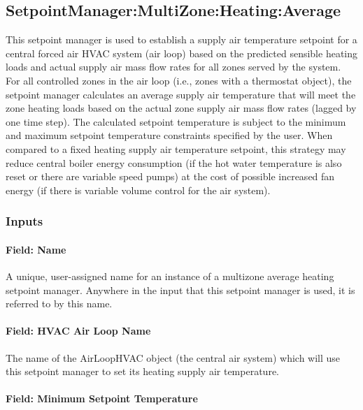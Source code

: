 \subsection{SetpointManager:MultiZone:Heating:Average}\label{setpointmanagermultizoneheatingaverage}

This setpoint manager is used to establish a supply air temperature setpoint for a central forced air HVAC system (air loop) based on the predicted sensible heating loads and actual supply air mass flow rates for all zones served by the system. For all controlled zones in the air loop (i.e., zones with a thermostat object), the setpoint manager calculates an average supply air temperature that will meet the zone heating loads based on the actual zone supply air mass flow rates (lagged by one time step). The calculated setpoint temperature is subject to the minimum and maximum setpoint temperature constraints specified by the user. When compared to a fixed heating supply air temperature setpoint, this strategy may reduce central boiler energy consumption (if the hot water temperature is also reset or there are variable speed pumps) at the cost of possible increased fan energy (if there is variable volume control for the air system).

\subsubsection{Inputs}\label{inputs-15-013}

\paragraph{Field: Name}\label{field-name-15-008}

A unique, user-assigned name for an instance of a multizone average heating setpoint manager. Anywhere in the input that this setpoint manager is used, it is referred to by this name.

\paragraph{Field: HVAC Air Loop Name}\label{field-hvac-air-loop-name-5}

The name of the AirLoopHVAC object (the central air system) which will use this setpoint manager to set its heating supply air temperature.

\paragraph{Field: Minimum Setpoint Temperature}\label{field-minimum-setpoint-temperature-5}

